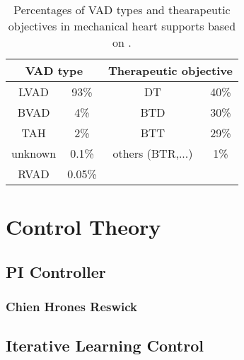 \begin{table}
  \centering
  \begin{tabular}{cc|cc}
    \toprule
    \multicolumn{2}{c|}{VAD type} &
    \multicolumn{2}{c}{Therapeutic objective} \\
    \midrule
    LVAD & 93\% & DT & 40\%\\
    BVAD & 4\% & BTD & 30\%\\
    TAH & 2\% & BTT & 29\%\\
    unknown & 0.1\% & others (BTR,...) & 1\%\\
    RVAD & 0.05\% & &\\
    \bottomrule
\end{tabular}
  \caption{Percentages of VAD types and thearapeutic objectives in mechanical heart supports based on \cite{VAD7}.}
  \label{tab:Table2}
\end{table}

\section{Control Theory}
\subsection{PI Controller}
\subsubsection{Chien Hrones Reswick}
\subsection{Iterative Learning Control}
